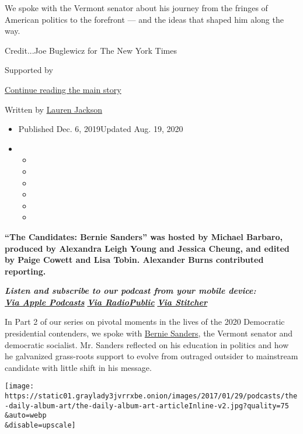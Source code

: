 We spoke with the Vermont senator about his journey from the fringes of
American politics to the forefront --- and the ideas that shaped him
along the way.

Credit...Joe Buglewicz for The New York Times

Supported by

\protect\hyperlink{after-sponsor}{Continue reading the main story}

Written by
\href{https://www.nytimes3xbfgragh.onion/by/lauren-jackson}{Lauren
Jackson}

\begin{itemize}
\item
  Published Dec. 6, 2019Updated Aug. 19, 2020
\item
  \begin{itemize}
  \item
  \item
  \item
  \item
  \item
  \item
  \end{itemize}
\end{itemize}

\textbf{``The Candidates: Bernie Sanders'' was hosted by Michael
Barbaro, produced by Alexandra Leigh Young and Jessica Cheung, and
edited by Paige Cowett and Lisa Tobin. Alexander Burns contributed
reporting.}

\emph{\textbf{Listen and subscribe to our podcast from your mobile
device:}}\\
\textbf{\href{https://itunes.apple.com/us/podcast/the-daily/id1200361736?mt=2}{\emph{Via
Apple Podcasts}}} \emph{\textbf{\textbar{}}}
\textbf{\href{https://play.radiopublic.com/88f7d8c3-7289-4dc6-b300-5ba71b43f5e5}{\emph{Via
RadioPublic}}} \emph{\textbf{\textbar{}}}
\textbf{\href{http://www.stitcher.com/podcast/the-new-york-times/the-daily-10}{\emph{Via
Stitcher}}}

In Part 2 of our series on pivotal moments in the lives of the 2020
Democratic presidential contenders, we spoke with
\href{https://www.nytimes3xbfgragh.onion/2020/01/17/podcasts/the-daily/bernie-sanders-latino.html}{Bernie
Sanders}, the Vermont senator and democratic socialist. Mr. Sanders
reflected on his education in politics and how he galvanized grass-roots
support to evolve from outraged outsider to mainstream candidate with
little shift in his message.

\texttt{[image: https://static01.graylady3jvrrxbe.onion/images/2017/01/29/podcasts/the-daily-album-art/the-daily-album-art-articleInline-v2.jpg?quality=75\\\&auto=webp\\\&disable=upscale]}

